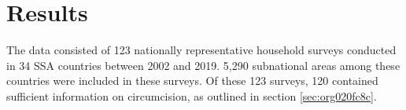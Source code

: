 \documentclass{article}
\begin{document}



\section{Results}
\label{sec:orgfc68fc8}


The data consisted of 123 nationally representative household surveys conducted in 34 SSA countries between
2002 and 2019. 5,290 subnational areas among these countries were included in these surveys.
Of these 123 surveys, 120 contained sufficient information on circumcision, as outlined in section \ref{sec:org020fc8c}.
\end{document}
